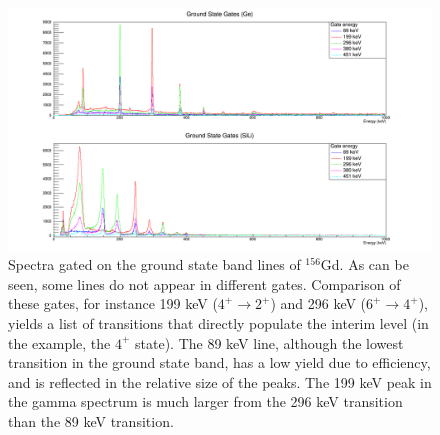 \begin{figure}[!]
    \centering
    \includegraphics[scale=0.27]{156GdTablesAndFigs/156GS_stack.png}
    \caption{Spectra gated on the ground state band lines of $^{156}$Gd. As can be seen, some lines do not appear in different gates. Comparison of these gates, for instance 199 keV ($4^+\rightarrow2^+$) and 296 keV ($6^+\rightarrow4^+$), yields a list of transitions that directly populate the interim level (in the example, the $4^+$ state). The 89 keV line, although the lowest transition in the ground state band, has a low yield due to efficiency, and is reflected in the relative size of the peaks. The 199 keV peak in the gamma spectrum is much larger from the 296 keV transition than the 89 keV transition.}
    \label{fig:156_GS_Gate}
\end{figure}